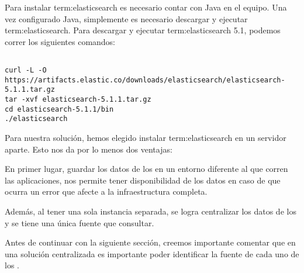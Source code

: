 Para instalar \gls{term:elasticsearch} es necesario contar con Java en el
equipo. Una vez configurado Java, simplemente es necesario descargar y
ejecutar \gls{term:elasticsearch}. Para descargar y ejecutar
\gls{term:elasticsearch} 5.1, podemos correr los siguientes comandos:

\begin{lstlisting}

curl -L -O https://artifacts.elastic.co/downloads/elasticsearch/elasticsearch-5.1.1.tar.gz
tar -xvf elasticsearch-5.1.1.tar.gz
cd elasticsearch-5.1.1/bin
./elasticsearch

\end{lstlisting}

Para nuestra solución, hemos elegido instalar \gls{term:elasticsearch} en un
servidor aparte. Esto nos da por lo menos dos ventajas:

En primer lugar, guardar los datos de los  en un entorno diferente al
que corren las aplicaciones, nos permite tener disponibilidad de los datos en
caso de que ocurra un error que afecte a la infraestructura completa.

Además, al tener una sola instancia separada, se logra centralizar los datos de
los  y se tiene una única fuente que consultar.

Antes de continuar con la siguiente sección, creemos importante comentar que en
una solución centralizada es importante poder identificar la fuente de cada uno
de los .
